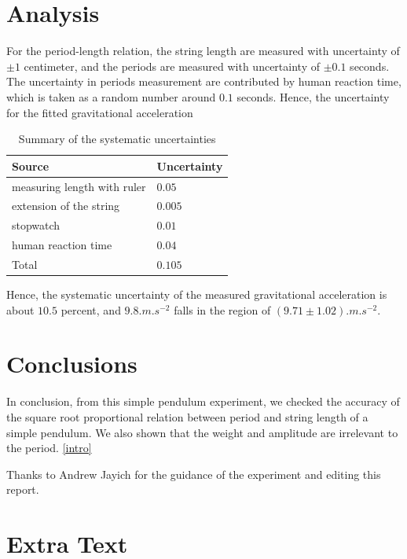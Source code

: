 \documentclass[twocolumn,preprintnumbers,amsmath,amssymb,longbibliography]{revtex4-1}
\begin{document}
\section{Analysis} 
For the period-length relation, the string length are measured with uncertainty of $\pm 1$ centimeter, and the periods are measured with uncertainty of $\pm 0.1$ seconds. The uncertainty in periods measurement are contributed by human reaction time, which is taken as a random number around $0.1$ seconds. Hence, the uncertainty for the fitted gravitational acceleration 
\begin{table}[H]
\caption{\label{table}Summary of the systematic uncertainties}
\begin{ruledtabular}
\begin{tabular}{ll}
Source&Uncertainty\\
\hline
measuring length with ruler & $0.05$ \\
extension of the string & $0.005$ \\
stopwatch & $0.01$ \\
human reaction time & $0.04$ \\
\hline
Total&$0.105$\\
\end{tabular}
\end{ruledtabular}
\end{table}
Hence, the systematic uncertainty of the measured gravitational acceleration is about $10.5$ percent, and $9.8 \si{.m.s^{-2}}$ falls in the region of $(9.71\pm 1.02) \si{.m.s^{-2}}$.
\section{Conclusions}
In conclusion, from this simple pendulum experiment, we checked the accuracy of the square root proportional relation between period and string length of a simple pendulum. We also shown that the weight and amplitude are irrelevant to the period. \ref{intro}

\begin{acknowledgments}
Thanks to Andrew Jayich for the guidance of the experiment and editing this report. 
\end{acknowledgments}

\appendix

\section{Extra Text}



\end{document}
